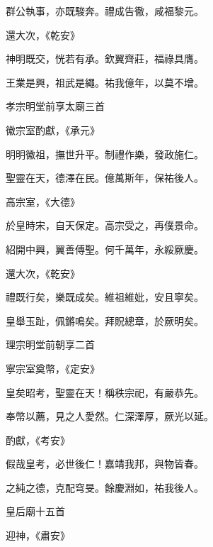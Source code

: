 \begin{pinyinscope}
 群公執事，亦既駿奔。禮成告徹，咸福黎元。



 還大次，《乾安》



 神明既交，恍若有承。欽翼齊莊，福祿具膺。



 王業是興，祖武是繩。祐我億年，以莫不增。



 孝宗明堂前享太廟三首



 徽宗室酌獻，《承元》



 明明徽祖，撫世升平。制禮作樂，發政施仁。



 聖靈在天，德澤在民。億萬斯年，保祐後人。



 高宗室，《大德》



 於皇時宋，自天保定。高宗受之，再僕景命。



 紹開中興，翼善傅聖。何千萬年，永綏厥慶。



 還大次，《乾安》



 禮既行矣，樂既成矣。維祖維妣，安且寧矣。



 皇舉玉趾，佩鏘鳴矣。拜貺總章，於厥明矣。



 理宗明堂前朝享二首



 寧宗室奠幣，《定安》



 皇矣昭考，聖靈在天！稱秩宗祀，有嚴恭先。



 奉幣以薦，見之人愛然。仁深澤厚，厥光以延。



 酌獻，《考安》



 假哉皇考，必世後仁！嘉靖我邦，與物皆春。



 之純之德，克配穹旻。餘慶淵如，祐我後人。



 皇后廟十五首



 迎神，《肅安》




\end{pinyinscope}

